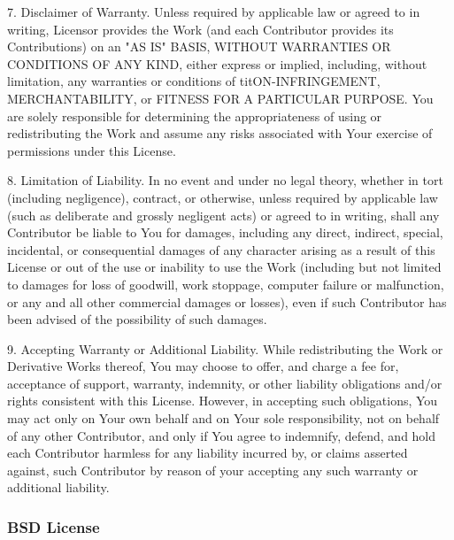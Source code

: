 \begin{DoxyVerb}
 7. Disclaimer of Warranty. Unless required by applicable law or
 agreed to in writing, Licensor provides the Work (and each
 Contributor provides its Contributions) on an "AS IS" BASIS,
 WITHOUT WARRANTIES OR CONDITIONS OF ANY KIND, either express or
 implied, including, without limitation, any warranties or conditions
 of titON-INFRINGEMENT, MERCHANTABILITY, or FITNESS FOR A
 PARTICULAR PURPOSE. You are solely responsible for determining the
 appropriateness of using or redistributing the Work and assume any
 risks associated with Your exercise of permissions under this License.

 8. Limitation of Liability. In no event and under no legal theory,
 whether in tort (including negligence), contract, or otherwise,
 unless required by applicable law (such as deliberate and grossly
 negligent acts) or agreed to in writing, shall any Contributor be
 liable to You for damages, including any direct, indirect, special,
 incidental, or consequential damages of any character arising as a
 result of this License or out of the use or inability to use the
 Work (including but not limited to damages for loss of goodwill,
 work stoppage, computer failure or malfunction, or any and all
 other commercial damages or losses), even if such Contributor
 has been advised of the possibility of such damages.

 9. Accepting Warranty or Additional Liability. While redistributing
 the Work or Derivative Works thereof, You may choose to offer,
 and charge a fee for, acceptance of support, warranty, indemnity,
 or other liability obligations and/or rights consistent with this
 License. However, in accepting such obligations, You may act only
 on Your own behalf and on Your sole responsibility, not on behalf
 of any other Contributor, and only if You agree to indemnify,
 defend, and hold each Contributor harmless for any liability
 incurred by, or claims asserted against, such Contributor by reason
 of your accepting any such warranty or additional liability.\end{DoxyVerb}
\hypertarget{aboutLicensesOSL_licenseOSBSD}{}\subsubsection{B\+S\+D License}\label{aboutLicensesOSL_licenseOSBSD}
